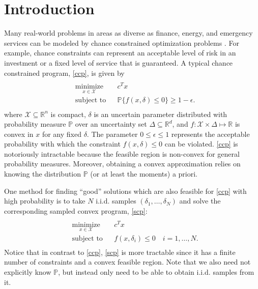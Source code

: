 \documentclass[12pt]{article}
\begin{document}
\section*{Introduction}
Many real-world problems in areas as diverse as finance, energy, and emergency services can be modeled by chance constrained optimization problems \cite{bental09}.
For example, chance constraints can represent an acceptable level of risk in an investment or a fixed level of service that is guaranteed.
A typical chance constrained program, \ref{ccp}, is given by
\begin{align}\label{ccp}
\begin{split}
\begin{aligned}
    & \underset{x \in \mathcal{X}}{\text{minimize}}
    & & c^T x \\
    & \text{subject to}
    & & \mathbb{P}\{f(x,\delta) \leq 0\} \geq 1-\epsilon.
\end{aligned}
\end{split} \tag{CCP$_\epsilon$}
\end{align}
where $\mathcal{X} \subseteq \mathbb{R}^n$ is compact, $\delta$ is an uncertain parameter distributed with probability measure $\mathbb{P}$ over an uncertainty set $\Delta \subseteq \mathbb{R}^d$, and $f:\mathcal{X} \times \Delta \mapsto \mathbb{R}$ is convex in $x$ for any fixed $\delta$.
The parameter $0 \leq \epsilon \leq 1$ represents the acceptable probability with which the constraint $f(x,\delta) \leq 0$ can be violated.
\ref{ccp} is notoriously intractable because the feasible region is non-convex for general probability measures.
Moreover, obtaining a convex approximation relies on knowing the distribution $\mathbb{P}$ (or at least the moments) a priori.

One method for finding ``good'' solutions which are also feasible for \ref{ccp} with high probability is to take $N$ i.i.d. samples $(\delta_1, \ldots, \delta_N)$ and solve the corresponding sampled convex program, \ref{scp}:
\begin{align}\label{scp}
\begin{split}
\begin{aligned}
    & \underset{x \in \mathcal{X}}{\text{minimize}}
    & & c^T x \\
    & \text{subject to}
    & & f(x,\delta_i) \leq 0 \quad i = 1, \ldots, N.
\end{aligned}
\end{split} \tag{SCP$_N$}
\end{align}
Notice that in contrast to \ref{ccp}, \ref{scp} is more tractable since it has a finite number of constraints and a convex feasible region. Note that we also need not explicitly know $\mathbb{P}$, but instead only need to be able to obtain i.i.d. samples from it.
\end{document}
